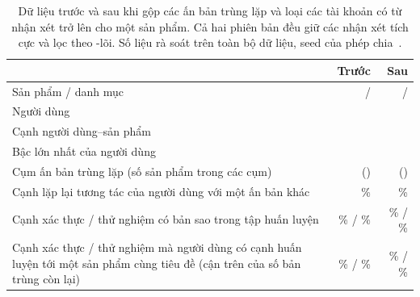 \begin{table}[htbp]
  \centering
  \small
  \caption{Dữ liệu trước và sau khi gộp các ấn bản trùng lặp và loại các tài khoản có từ
     nhận xét trở lên cho một sản phẩm. Cả hai phiên bản đều giữ các
    nhận xét tích cực và lọc theo -lõi. Số liệu rà soát trên toàn bộ dữ liệu, seed
    của phép chia~.}
  \label{tab:data}
  \begin{tabularx}{\linewidth}{@{}Lrr@{}}
    \toprule
    & Trước & Sau \\
    \midrule
    Sản phẩm / danh mục &  / 
      &  /  \\
    Người dùng &  &  \\
    Cạnh người dùng--sản phẩm &  &  \\
    Bậc lớn nhất của người dùng &  &  \\
    Cụm ấn bản trùng lặp (số sản phẩm trong các cụm) & 
      () &  () \\
    Cạnh lặp lại tương tác của người dùng với một ấn bản khác & \%
      & \% \\
    Cạnh xác thực / thử nghiệm có bản sao trong tập huấn luyện & \% /
      \% & \% / \% \\
    Cạnh xác thực / thử nghiệm mà người dùng có cạnh huấn luyện tới một sản phẩm cùng tiêu đề
      (cận trên của số bản trùng còn lại) & \% /
      \% & \% / \% \\
    \bottomrule
  \end{tabularx}
\end{table}
